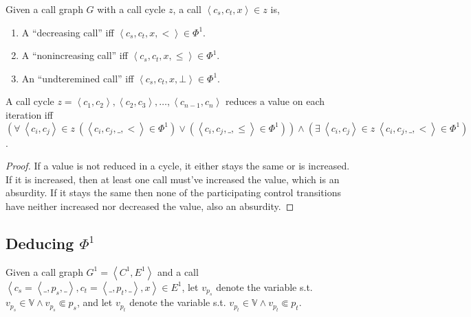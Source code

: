 \begin{definition}\label{definition:increasing-decreasing-call} Given a call
graph $G$ with a call cycle $z$, a call $\left\langle c_s,c_t,x\right\rangle\in
z$ is,

\begin{enumerate}

\item A ``decreasing call'' iff $\left\langle c_s,c_t,x,< \right\rangle \in
\Phi^1$.

\item A ``nonincreasing call'' iff $\left\langle c_s,c_t,x,\leq \right\rangle
\in \Phi^1$.

\item An ``undteremined call'' iff $\left\langle c_s,c_t,x,\bot \right\rangle
\in \Phi^1$.

\end{enumerate}

\end{definition}

\begin{lemma}\label{lemma:cycle-reduce} A call cycle $z= \left\langle c_1,c_2
\right\rangle, \left\langle c_2, c_3 \right\rangle,\ldots, \left\langle
c_{n-1}, c_n \right\rangle$ reduces a value on each iteration iff
$$\left(\forall\ \left\langle c_i,c_j \right\rangle \in z\ \left(\left\langle
c_i,c_j,\_, < \right\rangle \in \Phi^1\right) \vee \left(\left\langle
c_i,c_j,\_, \leq \right\rangle \in \Phi^1 \right)\right)\wedge \left( \exists\
\left\langle c_i,c_j \right\rangle \in z\ \left\langle c_i,c_j,\_, <
\right\rangle \in \Phi^1 \right)$$.\end{lemma}

\begin{proof} If a value is not reduced in a cycle, it either stays the same or
is increased. If it is increased, then at least one call must've increased the
value, which is an absurdity. If it stays the same then none of the
participating control transitions have neither increased nor decreased the
value, also an absurdity.\end{proof}

\subsection{Deducing $\Phi^1$}

\begin{definition} Given a call graph $G^1 = \left\langle C^1,
E^1\right\rangle$ and a call $\left\langle c_s = \left\langle \_,p_s,\_
\right\rangle, c_t = \left\langle \_, p_t, \_ \right\rangle, x \right\rangle
\in E^1$, let $v_{p_s}$ denote the variable s.t. $v_{p_s}\in\mathbb{V}\wedge
v_{p_s}\Subset p_s$, and let $v_{p_t}$ denote the variable s.t.
$v_{p_t}\in\mathbb{V}\wedge v_{p_t}\Subset p_t$. \end{definition}

